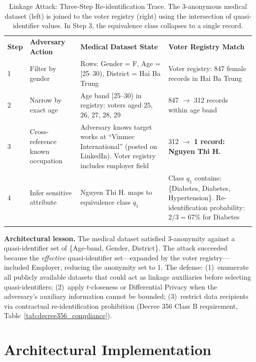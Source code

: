 \begin{table}[ht]
\centering
\caption{Linkage Attack: Three-Step Re-identification Trace. The 3-anonymous medical dataset (left) is joined to the voter registry (right) using the intersection of quasi-identifier values. In Step 3, the equivalence class collapses to a single record.}
\label{tab:linkage_attack}
\renewcommand{\arraystretch}{1.2}
\begin{tabular}{p{0.4cm} p{3.2cm} p{4.2cm} p{4.5cm}}
\hline\noalign{\smallskip}
\textbf{Step} & \textbf{Adversary Action} & \textbf{Medical Dataset State} & \textbf{Voter Registry Match} \\
\noalign{\smallskip}\svhline\noalign{\smallskip}
1 & Filter by gender & Rows: Gender = F, Age = [25--30), District = Hai Ba Trung & Voter registry: 847 female records in Hai Ba Trung \\[4pt]
2 & Narrow by exact age & Age band [25--30) in registry: voters aged 25, 26, 27, 28, 29 & 847 $\to$ 312 records within age band \\[4pt]
3 & Cross-reference known occupation & Adversary knows target works at ``Vinmec International'' (posted on LinkedIn). Voter registry includes employer field & \cellcolor{costhigh}312 $\to$ \textbf{1 record: Nguyen Thi H.} \\[4pt]
4 & Infer sensitive attribute & Nguyen Thi H. maps to equivalence class $q_1$ & Class $q_1$ contains: \{Diabetes, Diabetes, Hypertension\}. Re-identification probability: $2/3 = 67\%$ for Diabetes \\
\noalign{\smallskip}\hline\noalign{\smallskip}
\end{tabular}
\end{table}

\textbf{Architectural lesson.} The medical dataset satisfied 3-anonymity against a quasi-identifier set of \{Age-band, Gender, District\}. The attack succeeded because the \emph{effective} quasi-identifier set---expanded by the voter registry---included Employer, reducing the anonymity set to 1. The defense: (1)~enumerate all publicly available datasets that could act as linkage auxiliaries before selecting quasi-identifiers; (2)~apply $t$-closeness or Differential Privacy when the adversary's auxiliary information cannot be bounded; (3)~restrict data recipients via contractual re-identification prohibition (Decree 356 Class B requirement, Table~\ref{tab:decree356_compliance}).

\section{Architectural Implementation}
\label{sec:arch_implementation_anonymization}

